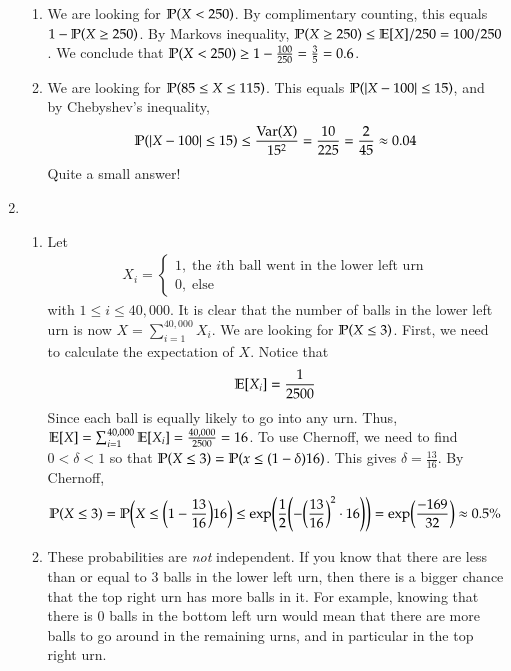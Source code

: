 \documentclass[12pt]{article}
\theoremstyle{definitionstyle}
\renewcommand{\P}{\mathbb{P}\qty}
\newcommand{\E}{\mathbb{E}\qty}
\newcommand{\Var}{\mathrm{Var}\qty}
\begin{document}
\begin{enumerate}[leftmargin=\labelsep]
\begin{enumerate}
			\item We are looking for $\P(X < 250)$. By complimentary counting, this equals $1 - \P(X \geq 250)$. By Markovs inequality, $\P(X \geq 250) \leq \E[X] / 250 = 100 / 250$. We conclude that $\P(X < 250) \geq 1 - \frac{100}{250} = \frac{3}{5} = 0.6$.
			
			\item We are looking for $\P(85 \leq X \leq 115)$. This equals $\P(|X - 100| \leq 15)$, and by Chebyshev's inequality,
			\begin{align*}
				\P(|X - 100| \leq 15) \leq \frac{\Var(X)}{15^2} = \frac{10}{225} = \frac{2}{45} \approx 0.04
			\end{align*}
			Quite a small answer!
		\end{enumerate}
		
		\newpage
		\item \begin{enumerate}
			\item Let \begin{align*}
				X_i = \begin{cases}
				1, \; \text{the $i$th ball went in the lower left urn} \\
				0, \; \text{else}
			\end{cases}
			\end{align*} with $1 \leq i \leq 40,000$. It is clear that the number of balls in the lower left urn is now $X = \sum_{i=1}^{40,000} X_i$. We are looking for $\P(X \leq 3)$. First, we need to calculate the expectation of $X$. Notice that
			\begin{align*}
				\E[X_i] = \frac{1}{2500}
			\end{align*}
			Since each ball is equally likely to go into any urn. Thus, $\E[X] = \sum_{i=1}^{40,000} \E[X_i] = \frac{40,000}{2500} = 16$. To use Chernoff, we need to find $0 < \delta < 1$ so that $\P(X \leq 3) = \P(x \leq (1-\delta)16)$. This gives $\delta = \frac{13}{16}$. By Chernoff,
			\begin{align*}
				\P(X \leq 3) = \P(X \leq \qty(1-\frac{13}{16})16) \leq \exp(\frac12\qty(-\qty(\frac{13}{16})^2 \cdot 16)) = \exp(\frac{-169}{32}) \approx 0.5\%
			\end{align*}
			
			\item These probabilities are \textit{not} independent. If you know that there are less than or equal to 3 balls in the lower left urn, then there is a bigger chance that the top right urn has more balls in it. For example, knowing that there is 0 balls in the bottom left urn would mean that there are more balls to go around in the remaining urns, and in particular in the top right urn.
			

\end{enumerate}
\end{enumerate}
\end{document}
